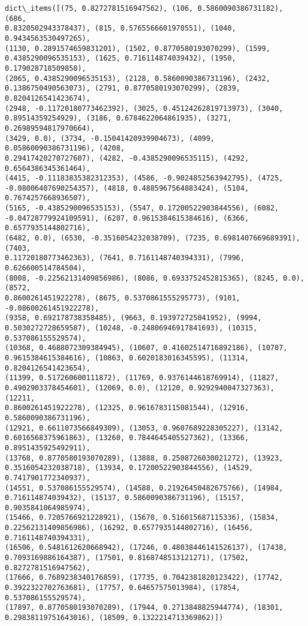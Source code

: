 \documentclass[11pt]{article}
\makeatletter
\newcommand{\boxspacing}{\kern\kvtcb@left@rule\kern\kvtcb@boxsep}
\newcommand{\prompt}[4]{
        \ttfamily\llap{{\color{#2}[#3]:\hspace{3pt}#4}}\vspace{-\baselineskip}
    }
\makeatother
\begin{document}
            \begin{tcolorbox}[breakable, size=fbox, boxrule=.5pt, pad at break*=1mm, opacityfill=0]
\prompt{Out}{outcolor}{21}{\boxspacing}
\begin{Verbatim}[commandchars=\\\{\}]
dict\_items([(75, 0.8272781516947562), (106, 0.5860090386731182), (686,
0.8320502943378437), (815, 0.5765566601970551), (1040, 0.9434563530497265),
(1130, 0.2891574659831201), (1502, 0.8770580193070299), (1599,
0.4385290096535153), (1625, 0.716114874039432), (1950, 0.179028718509858),
(2065, 0.4385290096535153), (2128, 0.5860090386731196), (2432,
0.1386750490563073), (2791, 0.8770580193070299), (2839, 0.8204126541423674),
(2948, -0.11720180773462392), (3025, 0.45124262819713973), (3040,
0.89514359254929), (3186, 0.6784622064861935), (3271, 0.26989594817970664),
(3429, 0.0), (3734, -0.15041420939904673), (4099, 0.05860090386731196), (4208,
0.29417420270727607), (4282, -0.4385290096535115), (4292, 0.6564386345361464),
(4415, -0.11183835382312353), (4586, -0.9024852563942795), (4725,
-0.08006407690254357), (4818, 0.4885967564883424), (5104, 0.7674257668936507),
(5165, -0.4385290096535153), (5547, 0.17200522903844556), (6082,
-0.04728779924109591), (6207, 0.9615384615384616), (6366, 0.6577935144802716),
(6482, 0.0), (6530, -0.3516054232038709), (7235, 0.6981407669689391), (7403,
0.11720180773462363), (7641, 0.7161148740394331), (7996, 0.626600514784504),
(8008, -0.22562131409856986), (8086, 0.6933752452815365), (8245, 0.0), (8572,
0.8600261451922278), (8675, 0.5370861555295773), (9101, -0.08600261451922278),
(9358, 0.692178738358485), (9663, 0.193972725041952), (9994,
0.5030272728659587), (10248, -0.24806946917841693), (10315, 0.537086155529574),
(10368, 0.4688072309384945), (10607, 0.41602514716892186), (10707,
0.9615384615384616), (10863, 0.6020183016345595), (11314, 0.8204126541423654),
(11399, 0.517260600111872), (11769, 0.9376144618769914), (11827,
0.4902903378454601), (12069, 0.0), (12120, 0.9292940047327363), (12211,
0.8600261451922278), (12325, 0.9616783115081544), (12916, 0.5860090386731196),
(12921, 0.6611073566849309), (13053, 0.9607689228305227), (13142,
0.6016568375961863), (13260, 0.7844645405527362), (13366, 0.8951435925492911),
(13768, 0.8770580193070289), (13888, 0.2508726030021272), (13923,
0.3516054232038718), (13934, 0.17200522903844556), (14529, 0.7417901772340937),
(14551, 0.537086155529574), (14588, 0.21926450482675766), (14984,
0.716114874039432), (15137, 0.5860090386731196), (15157, 0.9035841064985974),
(15466, 0.7205766921228921), (15670, 0.516015687115336), (15834,
0.22562131409856986), (16292, 0.6577935144802716), (16456, 0.7161148740394331),
(16506, 0.5481612620668942), (17246, 0.48038446141526137), (17438,
0.7093169886164387), (17501, 0.8168748513121271), (17502, 0.8272781516947562),
(17666, 0.7689238340176859), (17735, 0.7042381820123422), (17742,
0.3922322702763681), (17757, 0.64657575013984), (17854, 0.537086155529574),
(17897, 0.8770580193070289), (17944, 0.2713848825944774), (18301,
0.29838119751643016), (18509, 0.1322214713369862)])
\end{Verbatim}
\end{tcolorbox}
        
\end{document}
